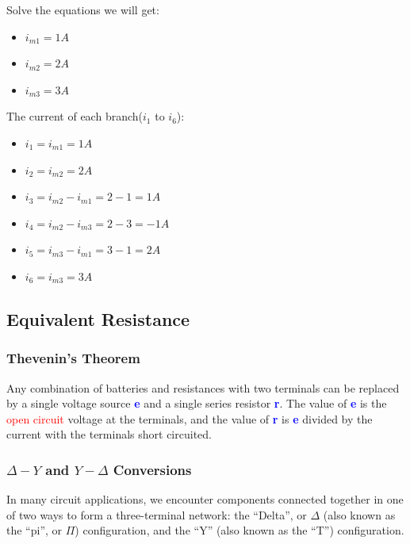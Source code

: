 \documentclass[a4 paper]{article}
\newcommand{\blue}[1]{\textcolor{blue}{#1}}
\newcommand{\red}[1]{\textcolor{red}{#1}}
\numberwithin{equation}{section}
\newcommand{\0}{\mathbf{0}}
\begin{document}
Solve the equations we will get:


\begin{itemize} \itemsep3pt \parskip0pt  
  \item[] \hspace{6.6 cm}$i_{m1} = 1A$
  \item[] \hspace{6.6 cm}$i_{m2} = 2A$
  \item[] \hspace{6.6 cm}$i_{m3} = 3A$
\end{itemize}

The current of each branch($i_1$ to $i_6$):


\begin{itemize} \itemsep3pt \parskip0pt  
  \item[] \hspace{6.6 cm}$i_1 = i_{m1} = 1A$
  \item[] \hspace{6.6 cm}$i_2 = i_{m2} = 2A$
  \item[] \hspace{6.6 cm}$i_3 = i_{m2} - i_{m1} = 2-1 = 1A$
  \item[] \hspace{6.6 cm}$i_4 = i_{m2} - i_{m3} = 2-3 = -1A$
  \item[] \hspace{6.6 cm}$i_5 = i_{m3} - i_{m1} = 3-1 = 2A$
  \item[] \hspace{6.6 cm}$i_6 = i_{m3} = 3A$
\end{itemize}


\subsection{Equivalent Resistance}
\subsubsection{Thevenin's Theorem}
Any combination of batteries and resistances with two terminals can be replaced by a single voltage source \blue{\bf e} and a single series resistor \blue{\bf r}. The value of \blue{\bf e} is the \red{open circuit} voltage at the terminals, and the value of \blue{\bf r} is \blue{\bf e} divided by the current with the terminals short circuited.

\subsubsection{$\Delta-Y$ and $Y-\Delta$ Conversions}
In many circuit applications, we encounter components connected together in one of two ways to form a three-terminal network: the ``Delta'', or $\Delta$ (also known as the ``pi'', or $\Pi$) configuration, and the “Y” (also known as the “T”) configuration.
\end{document}
